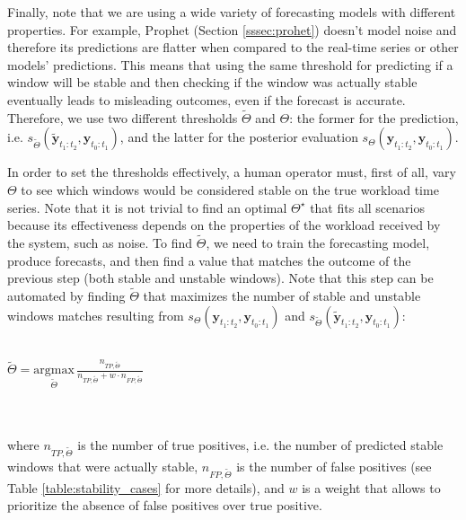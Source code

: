 \documentclass[a4paper, 12pt]{article} %
\begin{document}
	Finally, note that we are using a wide variety of forecasting models with different properties. For example, Prophet (Section \ref{sssec:prohet}) doesn't model noise and therefore its predictions are flatter when compared to the real-time series or other models' predictions. This means that using the same threshold for predicting if a window will be stable and then checking if the window was actually stable eventually leads to misleading outcomes, even if the forecast is accurate. Therefore, we use two different thresholds $\tilde{\Theta}$ and $\Theta$: the former for the prediction, i.e. $s_{\tilde{\Theta}}(\tilde{\pmb{y}}_{t_1:t_2}, \pmb{y}_{t_0:t_1})$, and the latter for the posterior evaluation $s_\Theta(\pmb{y}_{t_1:t_2}, \pmb{y}_{t_0:t_1})$.
	
	In order to set the thresholds effectively, a human operator must, first of all, vary $\Theta$ to see which windows would be considered stable on the true workload time series. Note that it is not trivial to find an optimal $\Theta^\star$ that fits all scenarios because its effectiveness depends on the properties of the workload received by the system, such as noise. To find $\tilde{\Theta}$, we need to train the forecasting model, produce forecasts, and then find a value that matches the outcome of the previous step (both stable and unstable windows). Note that this step can be automated by finding $\tilde{\Theta}$ that maximizes the number of stable and unstable windows matches resulting from $s_\Theta(\pmb{y}_{t_1:t_2}, \pmb{y}_{t_0:t_1})$ and $s_{\tilde{\Theta}}(\tilde{\pmb{y}}_{t_1:t_2}, \pmb{y}_{t_0:t_1})$: \\\\
	\centerline{
		$
		\tilde{\Theta} = \underset{ \tilde{\Theta}} {\mathrm{argmax}}\, \frac{n_{TP, \tilde{\Theta}} }{n_{TP, \tilde{\Theta}} + w \cdot n_{FP, \tilde{\Theta}}}
		$
	}\\\\
	where $n_{TP, \tilde{\Theta}}$ is the number of true positives, i.e. the number of predicted stable windows that were actually stable, $n_{FP, \tilde{\Theta}}$ is the number of false positives (see Table \ref{table:stability_cases} for more details), and $w$ is a weight that allows to prioritize the absence of false positives over true positive.
\end{document}
